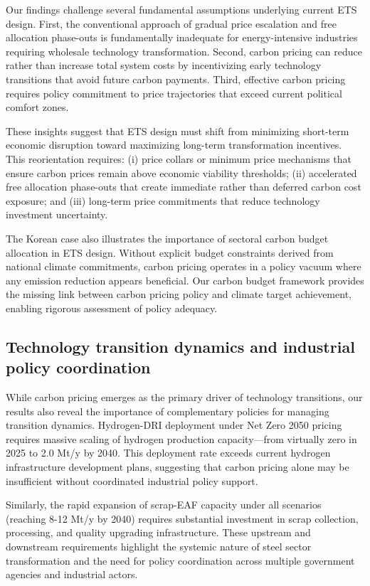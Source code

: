 \documentclass[preprint,5p,authoryear]{elsarticle}
\begin{document}
Our findings challenge several fundamental assumptions underlying current ETS design. First, the conventional approach of gradual price escalation and free allocation phase-outs is fundamentally inadequate for energy-intensive industries requiring wholesale technology transformation. Second, carbon pricing can reduce rather than increase total system costs by incentivizing early technology transitions that avoid future carbon payments. Third, effective carbon pricing requires policy commitment to price trajectories that exceed current political comfort zones.

These insights suggest that ETS design must shift from minimizing short-term economic disruption toward maximizing long-term transformation incentives. This reorientation requires: (i) price collars or minimum price mechanisms that ensure carbon prices remain above economic viability thresholds; (ii) accelerated free allocation phase-outs that create immediate rather than deferred carbon cost exposure; and (iii) long-term price commitments that reduce technology investment uncertainty.

The Korean case also illustrates the importance of sectoral carbon budget allocation in ETS design. Without explicit budget constraints derived from national climate commitments, carbon pricing operates in a policy vacuum where any emission reduction appears beneficial. Our carbon budget framework provides the missing link between carbon pricing policy and climate target achievement, enabling rigorous assessment of policy adequacy.

\subsection{Technology transition dynamics and industrial policy coordination}

While carbon pricing emerges as the primary driver of technology transitions, our results also reveal the importance of complementary policies for managing transition dynamics. Hydrogen-DRI deployment under Net Zero 2050 pricing requires massive scaling of hydrogen production capacity—from virtually zero in 2025 to 2.0 Mt/y by 2040. This deployment rate exceeds current hydrogen infrastructure development plans, suggesting that carbon pricing alone may be insufficient without coordinated industrial policy support.

Similarly, the rapid expansion of scrap-EAF capacity under all scenarios (reaching 8-12 Mt/y by 2040) requires substantial investment in scrap collection, processing, and quality upgrading infrastructure. These upstream and downstream requirements highlight the systemic nature of steel sector transformation and the need for policy coordination across multiple government agencies and industrial actors.
\end{document}
